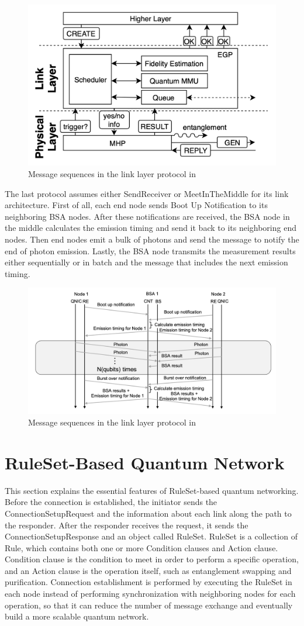 \begin{figure}[H]
  \centerline{\includegraphics[width=.5\columnwidth]{images/link_protocol_dahlberg.png}}
  \caption{Message sequences in the link layer protocol in  \cite{Dahlberg_2019}}
\end{figure}

The last protocol \cite{matsuo2019simulation} assumes either SendReceiver or MeetInTheMiddle for its link architecture. First of all, each end node sends Boot Up Notification to its neighboring BSA nodes.
After these notifications are received, the BSA node in the middle calculates the emission timing and send it back to its neighboring end nodes.
Then end nodes emit a bulk of photons and send the message to notify the end of photon emission.
Lastly, the BSA node transmits the measurement results either sequentially or in batch and the message that includes the next emission timing.
\begin{figure}[H]
  \centerline{\includegraphics[width=.5\columnwidth]{images/link_protocol_matsuo.png}}
  \caption{Message sequences in the link layer protocol in \cite{matsuo2019simulation}}
\end{figure}

\section{RuleSet-Based Quantum Network}

This section explains the essential features of RuleSet-based quantum networking. Before the connection is established, the initiator sends the ConnectionSetupRequest and the information about each link along the path to the responder.
After the responder receives the request, it sends the ConnectionSetupResponse and an object called RuleSet.
RuleSet is a collection of Rule, which contains both one or more Condition clauses and Action clause. Condition clause is the condition to meet in order to perform a specific operation, and an Action clause is the operation itself, such as entanglement swapping and purification.
Connection establishment is performed by executing the RuleSet in each node instead of performing synchronization with neighboring nodes for each operation, so that it can reduce the number of message exchange and eventually build a more scalable quantum network.

